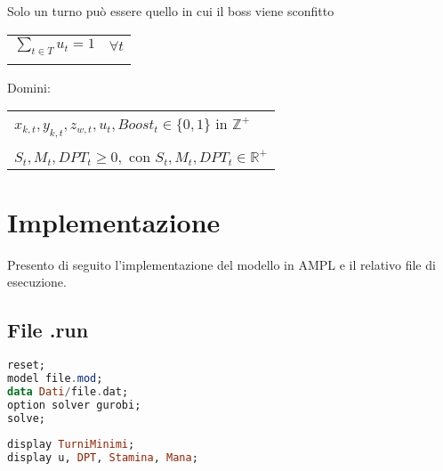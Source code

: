 \documentclass[12pt]{article}
\begin{document}
    Solo un turno può essere quello in cui il boss viene sconfitto \\
    \begin{tabular*}{\textwidth}{@{\extracolsep{\fill}} ll}
        \\
        $\sum_{t \in T} u_t = 1$  & $\forall t$\\
        \\
    \end{tabular*}

    Domini:\\
    \begin{tabular*}{\textwidth}{@{\extracolsep{\fill}} l}\\
        $x_{k,t}, y_{k,t}, z_{w,t}, u_t, Boost_t \in \{0,1\}$ in $\mathbb{Z}^+$\\
         \\
         $S_t, M_t, DPT_t \geq 0, \text{ con  } S_t, M_t, DPT_t \in \mathbb{R}^+$\\
    \end{tabular*}
    
    \section{Implementazione}
    Presento di seguito l'implementazione del modello in AMPL e il relativo file di esecuzione.
    \subsection{File .run}
    \begin{lstlisting}[language=haskell, frame=single, caption={File di esecuzione}, captionpos=b, keywordstyle=\color{purple}]  
reset;
model file.mod;
data Dati/file.dat; 
option solver gurobi; 
solve;
        
display TurniMinimi; 
display u, DPT, Stamina, Mana; 
    \end{lstlisting}
\newpage
\end{document}
